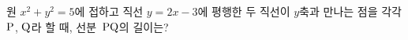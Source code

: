 원 $x^2+y^2=5$에 접하고 직선 $y=2x-3$에 평행한 두 직선이 $y$축과 만나는 점을 각각 $\mathrm{P}$, $\mathrm{Q}$라 할 때, 선분~$\mathrm{PQ}$의 길이는?
